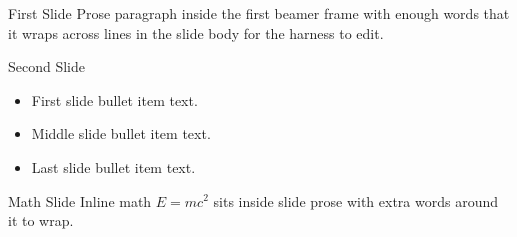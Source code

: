 \documentclass{beamer}
\begin{document}
\begin{frame}{First Slide}
Prose paragraph inside the first beamer frame with enough words that it wraps
across lines in the slide body for the harness to edit.
\end{frame}

\begin{frame}{Second Slide}
\begin{itemize}
\item First slide bullet item text.
\item Middle slide bullet item text.
\item Last slide bullet item text.
\end{itemize}
\end{frame}

\begin{frame}{Math Slide}
Inline math $E = mc^2$ sits inside slide prose with extra words around it to wrap.
\end{frame}
\end{document}
